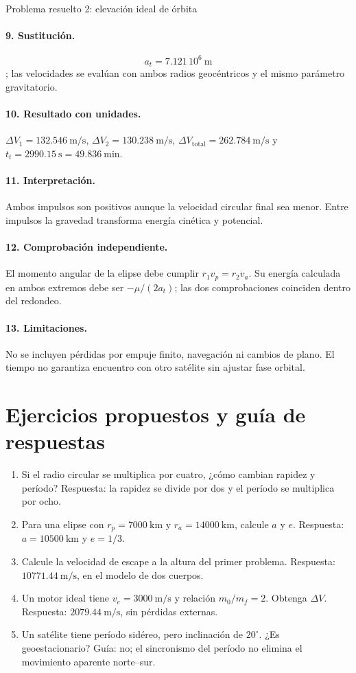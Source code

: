 \begin{studiumworked}{Problema resuelto 2: elevación ideal de órbita}
\paragraph{9. Sustitución.} \[a_t=7.121\,10^6\ \mathrm m\]; las velocidades se evalúan con ambos radios geocéntricos y el mismo parámetro gravitatorio.
\paragraph{10. Resultado con unidades.} $\Delta V_1=132.546\ \mathrm{m/s}$, $\Delta V_2=130.238\ \mathrm{m/s}$, $\Delta V_{\mathrm{total}}=262.784\ \mathrm{m/s}$ y $t_t=2990.15\ \mathrm s=49.836\ \mathrm{min}$.
\paragraph{11. Interpretación.} Ambos impulsos son positivos aunque la velocidad circular final sea menor. Entre impulsos la gravedad transforma energía cinética y potencial.
\paragraph{12. Comprobación independiente.} El momento angular de la elipse debe cumplir $r_1v_p=r_2v_a$. Su energía calculada en ambos extremos debe ser $-\mu/(2a_t)$; las dos comprobaciones coinciden dentro del redondeo.
\paragraph{13. Limitaciones.} No se incluyen pérdidas por empuje finito, navegación ni cambios de plano. El tiempo no garantiza encuentro con otro satélite sin ajustar fase orbital.


\end{studiumworked}

\section{Ejercicios propuestos y guía de respuestas}
\begin{enumerate}
\item Si el radio circular se multiplica por cuatro, ¿cómo cambian rapidez y período? Respuesta: la rapidez se divide por dos y el período se multiplica por ocho.
\item Para una elipse con $r_p=7000\ \mathrm{km}$ y $r_a=14000\ \mathrm{km}$, calcule $a$ y $e$. Respuesta: $a=10500\ \mathrm{km}$ y $e=1/3$.
\item Calcule la velocidad de escape a la altura del primer problema. Respuesta: $10771.44\ \mathrm{m/s}$, en el modelo de dos cuerpos.
\item Un motor ideal tiene $v_e=3000\ \mathrm{m/s}$ y relación $m_0/m_f=2$. Obtenga $\Delta V$. Respuesta: $2079.44\ \mathrm{m/s}$, sin pérdidas externas.
\item Un satélite tiene período sidéreo, pero inclinación de $20^\circ$. ¿Es geoestacionario? Guía: no; el sincronismo del período no elimina el movimiento aparente norte--sur.
\end{enumerate}

